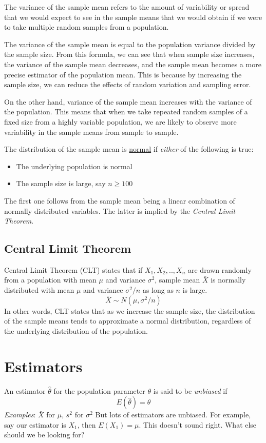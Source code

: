 \documentclass{./../../Latex/handout}
\begin{document}
The variance of the sample mean refers to the amount of variability or spread that we would expect to see in the sample means that we would obtain if we were to take multiple random samples from a population. 

The variance of the sample mean is equal to the population variance divided by the sample size. From this formula, we can see that when sample size increases, the variance of the sample mean decreases, and the sample mean becomes a more precise estimator of the population mean. This is because by increasing the sample size, we can reduce the effects of random variation and sampling error. 

On the other hand, variance of the sample mean increases with the variance of the population. This means that when we take repeated random samples of a fixed size from a highly variable population, we are likely to observe more variability in the sample means from sample to sample.

The distribution of the sample mean is \underline{normal} if \textit{either} of the following is true: 
\begin{itemize}
  \item The underlying population is normal \vspace{-1em}
  \item The sample size is large, say $n\geq 100$ 
\end{itemize}
The first one follows from the sample mean being a linear combination of normally distributed variables. The latter is implied by the \textit{Central Limit Theorem}. 

\subsection*{Central Limit Theorem}

Central Limit Theorem (CLT) states that if $X_1, X_2,..,X_n$ are drawn randomly from a population with mean $\mu$ and variance $\sigma^2$, sample mean $\bar{X}$ is normally distributed with mean $\mu$ and variance $\sigma^2/n$ as long as $n$ is large.
$$\bar{X} \sim N(\mu, \sigma^2/n)$$
 In other words, CLT states that as we increase the sample size, the distribution of the sample means tends to approximate a normal distribution, regardless of the underlying distribution of the population.

\section{Estimators}
An estimator $\hat{\theta}$ for the population parameter $\theta$ is said to be \textit{unbiased} if 
$$ E(\hat{\theta}) = \theta $$
\textit{Examples}: $\bar{X}$ for $\mu$, $s^2$ for $\sigma^2$
But lots of estimators are unbiased. For example, say our estimator is $X_1$, then $E(X_1) = \mu$. This doesn't sound right. What else should we be looking for? 
\end{document}
